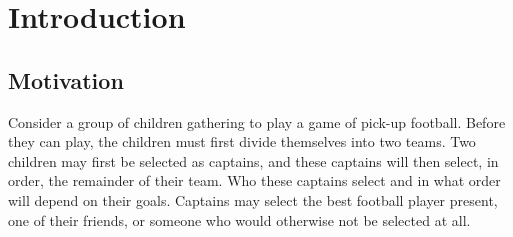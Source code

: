 \chapter{\label{ch:intro}Introduction} 



\minitoc

\section{Motivation}


Consider a group of children gathering to play a game of pick-up football. Before they can play, the children must first divide themselves into two teams. Two children may first be selected as captains, and these captains will then select, in order, the remainder of their team. Who these captains select and in what order will depend on their goals. Captains may select the best football player present, one of their friends, or someone who would otherwise not be selected at all.

